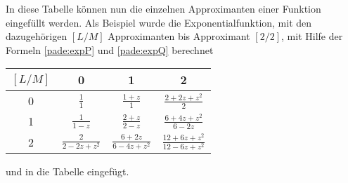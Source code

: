 In diese Tabelle können nun die einzelnen Approximanten einer Funktion eingefüllt werden.
Als Beispiel wurde die Exponentialfunktion, mit den dazugehörigen $[L/M]$ Approximanten bis Approximant $[2/2]$, mit Hilfe der Formeln \ref{pade:expP} und \ref{pade:expQ} berechnet  
\begin{center}
	\begin{tabular}{c| c c c }
		$[L/M]$ 	& 0 		& 1 		& 2 	 \\
		\hline
		0 		& $\frac{1}{1}$ 	& $\frac{1+z}{1}$ 	& $\frac{2+2 z+z^{2}}{2}$ \\
		1 		& $\frac{1}{1-z}$ 	& $\frac{2+z}{2-z}$ 	& $\frac{6+4 z+z^{2}}{6-2 z}$ 	 \\
		2 		& $\frac{2}{2-2 z+z^{2}} $ 	& $\frac{6+2 z}{6-4 z+z^{2}}$ 	& $\frac{12+6 z+z^{2}}{12-6 z+z^{2}}$ 	 \\
	\end{tabular}
\end{center}
und in die Tabelle eingefügt.













